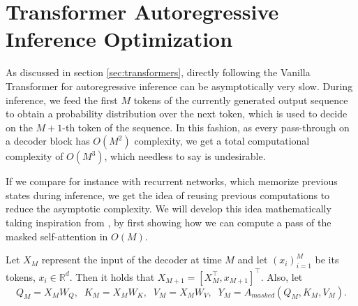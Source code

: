 \section{Transformer Autoregressive Inference Optimization}
\label{sec:appendix}

As discussed in section \ref{sec:transformers}, directly following the Vanilla Transformer for autoregressive inference can be asymptotically very slow. During inference, we feed the first $M$ tokens of the currently generated output sequence to obtain a probability distribution over the next token, which is used to decide on the $M+1$-th token of the sequence. In this fashion, as every pass-through on a decoder block has $O(M^2)$ complexity, we get a total computational complexity of $O(M^3)$, which needless to say is undesirable.

If we compare for instance with recurrent networks, which memorize previous states during inference, we get the idea of reusing previous computations to reduce the asymptotic complexity. We will develop this idea mathematically taking inspiration from \cite{leimao2023optiminference}, by first showing how we can compute a pass of the masked self-attention in $O(M)$. 

Let $X_M$ represent the input of the decoder at time $M$ and let $(x_i)_{i=1}^M$ be its tokens, $x_i \in \mathbb{R}^d$. Then it holds that $X_{M+1} = [X_M^\top, x_{M+1}]^\top$. Also, let 
\begin{equation}
    Q_M = X_M W_Q, \;\; K_M = X_M W_K, \;\; V_M = X_M W_V,\;\; Y_M = A_{masked}(Q_M, K_M, V_M).
\end{equation}

